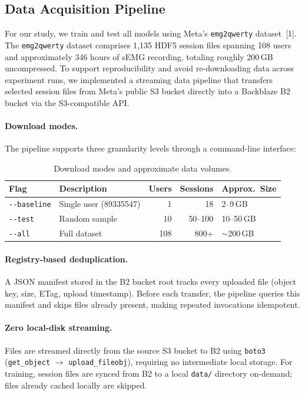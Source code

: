 \documentclass{article}
\begin{document}
\subsection{Data Acquisition Pipeline}
For our study, we train and test all models using Meta's \texttt{emg2qwerty} dataset~[1]. The \texttt{emg2qwerty} dataset comprises 1{,}135 HDF5 session files spanning 108 users
and approximately 346 hours of sEMG recording, totaling roughly 200\,GB uncompressed.
To support reproducibility and avoid re-downloading data across experiment runs, we
implemented a streaming data pipeline that transfers selected session files from Meta's
public S3 bucket directly into a Backblaze B2 bucket via the S3-compatible API.

\paragraph{Download modes.}
The pipeline supports three granularity levels through a command-line interface:

\medskip

\begin{table}[h]
\centering
\begin{tabular}{llrrl}
\toprule
\textbf{Flag} & \textbf{Description} & \textbf{Users} & \textbf{Sessions} & \textbf{Approx.\ Size} \\
\midrule
\texttt{-{}-baseline} & Single user (89335547) & 1 & 18 & 2--9\,GB \\
\texttt{-{}-test}     & Random sample          & 10 & 50--100 & 10--50\,GB \\
\texttt{-{}-all}      & Full dataset           & 108 & 800+ & $\sim$200\,GB \\
\bottomrule
\end{tabular}
\caption{Download modes and approximate data volumes.}
\label{tab:download-modes}
\end{table}

\paragraph{Registry-based deduplication.}
A JSON manifest stored in the B2 bucket root tracks every uploaded file
(object key, size, ETag, upload timestamp). Before each transfer, the pipeline
queries this manifest and skips files already present, making repeated
invocations idempotent.

\paragraph{Zero local-disk streaming.}
Files are streamed directly from the source S3 bucket to B2 using \texttt{boto3}
(\texttt{get\_object} $\to$ \texttt{upload\_fileobj}), requiring no intermediate
local storage. For training, session files are synced from B2 to a local
\texttt{data/} directory on-demand; files already cached locally are skipped.
\end{document}
